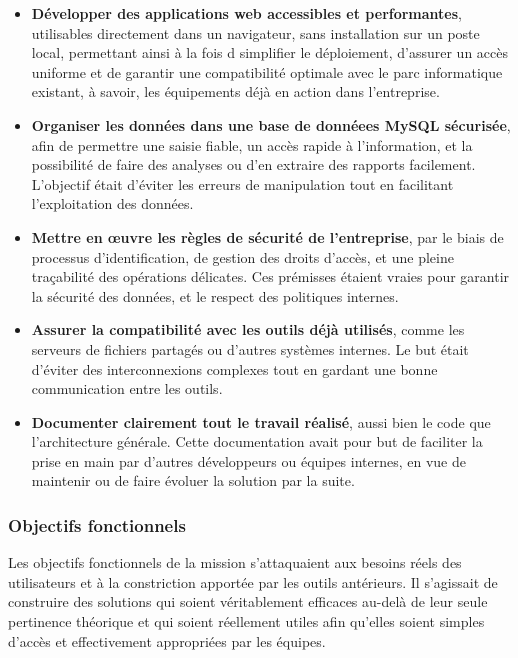\documentclass[11pt,a4paper]{article}
\begin{document}
\begin{itemize}
    \item \textbf{Développer des applications web accessibles et performantes}, utilisables directement dans un navigateur, sans installation sur un poste local, permettant ainsi à la fois d simplifier le déploiement, d’assurer un accès uniforme et de garantir une compatibilité optimale avec le parc informatique existant, à savoir, les équipements déjà en action dans l’entreprise.
    
    \item \textbf{Organiser les données dans une base de donnéees MySQL sécurisée}, afin de permettre une saisie fiable, un accès rapide à l’information, et la possibilité de faire des analyses ou d’en extraire des rapports facilement. L’objectif était d’éviter les erreurs de manipulation tout en facilitant l’exploitation des données.
    \item \textbf{Mettre en œuvre les règles de sécurité de l’entreprise}, par le biais de processus d’identification, de gestion des droits d’accès, et une pleine traçabilité des opérations délicates. Ces prémisses étaient vraies pour garantir la sécurité des données, et le respect des politiques internes.
    
    \item \textbf{Assurer la compatibilité avec les outils déjà utilisés}, comme les serveurs de fichiers partagés ou d’autres systèmes internes. Le but était d’éviter des interconnexions complexes tout en gardant une bonne communication entre les outils.
    
    \item \textbf{Documenter clairement tout le travail réalisé}, aussi bien le code que l’architecture générale. Cette documentation avait pour but de faciliter la prise en main par d’autres développeurs ou équipes internes, en vue de maintenir ou de faire évoluer la solution par la suite.


\end{itemize}

\subsubsection{Objectifs fonctionnels}
Les objectifs fonctionnels de la mission s’attaquaient aux besoins réels des utilisateurs et à la constriction apportée par les outils antérieurs. Il s’agissait de construire des solutions qui soient véritablement efficaces au-delà de leur seule pertinence théorique et qui soient réellement utiles afin qu’elles soient simples d’accès et effectivement appropriées par les équipes.
\end{document}
